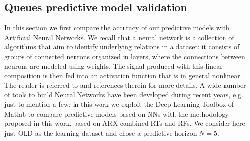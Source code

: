 
\subsection{Queues predictive model validation}

In this section we first compare the accuracy of our predictive models with Artificial Neural Networks. We recall that a neural network is a collection of algorithms that aim to identify underlying relations in a dataset: it consists of groups of connected neurons organized in layers, where the connections between neurons are modeled using weights. The signal produced with this linear composition is then fed into an activation function that is in general nonlinear. The reader is referred to \cite{NNstateOfART} and references therein for more details. A wide number of tools to build Neural Networks have been developed during recent years, e.g. \cite{tensorflow2015,chollet2015keras,openNN} just to mention a few: in this work we exploit the Deep Learning Toolbox of Matlab to compare predictive models based on NNs with the methodology proposed in this work, based on ARX combined RTs and RFs. We consider here just OLD as the learning dataset and chose a predictive horizon $N=5$.

